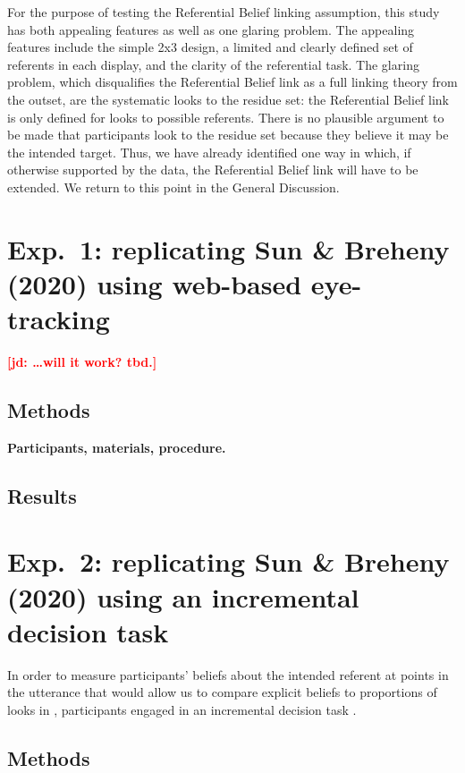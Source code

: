 \documentclass[10pt,letterpaper]{article}
\newcommand{\jd}[1]{\textcolor{Red}{\textbf{[jd: #1]}}}
\begin{document}
For the purpose of testing the Referential Belief linking assumption, this study has both appealing features as well as one glaring problem. The appealing features include the simple 2x3 design, a limited and clearly defined set of referents in each display, and the clarity of the referential task. The glaring problem, which disqualifies the Referential Belief link as a full linking theory from the outset, are the systematic looks to the residue set: the Referential Belief link is only defined for looks to possible referents. There is no plausible argument to be made that participants look to the residue set because they believe it may be the intended target.  Thus, we have already identified one way in which, if otherwise supported by the data, the Referential Belief link will have to be extended. We return to this point in the General Discussion.


\section{Exp.~1: replicating Sun \& Breheny (2020) using web-based eye-tracking}

\jd{\dots will it work? tbd.}

\subsection{Methods}

\textbf{Participants, materials, procedure.} 

\subsection{Results}

\section{Exp.~2: replicating Sun \& Breheny (2020) using an incremental decision task}

In order to measure participants' beliefs about the intended referent at points in the utterance that would allow us to compare explicit beliefs to proportions of looks in , participants engaged in an incremental decision task \cite{Allopenna1998,QingLD2018, KreissDegen2020}. 

\subsection{Methods}
\end{document}
